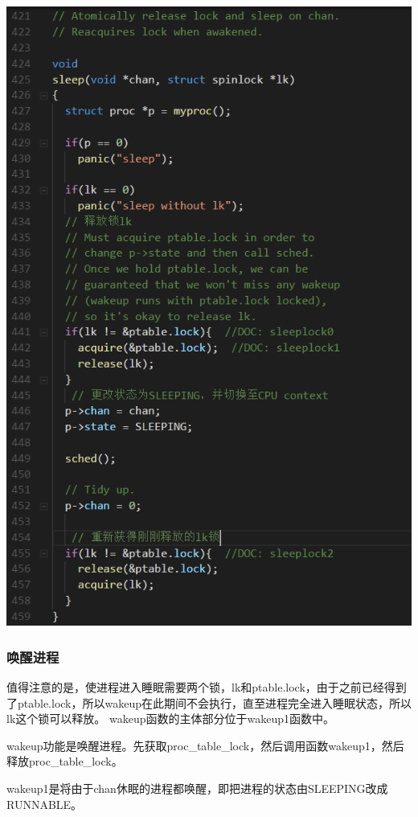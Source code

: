 \includegraphics[width=6in]{figures/process/fig12.png}

\subsubsection{唤醒进程}

值得注意的是，使进程进入睡眠需要两个锁，lk和ptable.lock，由于之前已经得到了ptable.lock，所以wakeup在此期间不会执行，直至进程完全进入睡眠状态，所以lk这个锁可以释放。
wakeup函数的主体部分位于wakeup1函数中。

wakeup功能是唤醒进程。先获取proc\_table\_lock，然后调用函数wakeup1，然后释放proc\_table\_lock。

wakeup1是将由于chan休眠的进程都唤醒，即把进程的状态由SLEEPING改成RUNNABLE。

